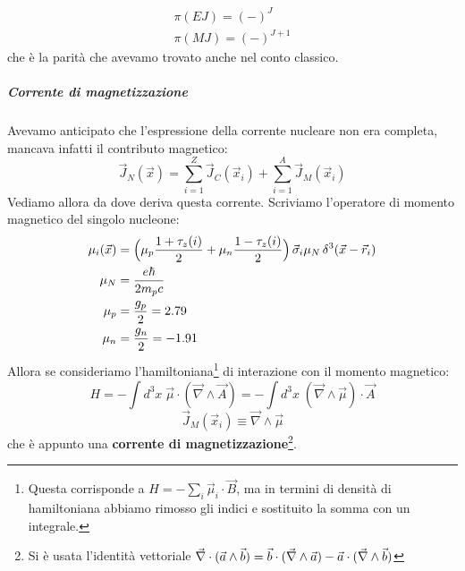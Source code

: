 \begin{displaymath}
\begin{array}{l}
    \pi(EJ) = (-)^J \\
    \pi(MJ) = (-)^{J+1}  
\end{array}
\end{displaymath}
che è la parità che avevamo trovato anche nel conto classico.

\subparagraph{Corrente di magnetizzazione} Avevamo anticipato che l'espressione della corrente nucleare non era completa, mancava infatti il contributo magnetico:
$$\vec{J}_N(\vec{x}) = \sum_{i=1}^Z \vec{J}_C(\vec{x}_i) + \sum_{i=1}^A \vec{J}_M (\vec{x}_i)$$
Vediamo allora da dove deriva questa corrente. Scriviamo l'operatore di momento magnetico del singolo nucleone:
\begin{displaymath}
\begin{aligned}
\mu_i (\vec{x}) &= \Bigl ( \mu_p \frac{1+\tau_z(i)}{2} + \mu_n \frac{1-\tau_z(i)}{2} \Bigr )\, \vec{\sigma}_i \mu_N \, \delta^3(\vec{x}-\vec{r}_i) \\
\mu_N &= \frac{e\hbar}{2m_pc} \\
\mu_p &= \frac{g_p}{2} = 2.79 \\
\mu_n &= \frac{g_n}{2} = -1.91
\end{aligned}
\end{displaymath}
Allora se consideriamo l'hamiltoniana\footnote{Questa corrisponde a $H = -\sum_i \vec{\mu}_i \cdot \vec{B}$, ma in termini di densità di hamiltoniana abbiamo rimosso gli indici e sostituito la somma con un integrale.} di interazione con il momento magnetico:
$$H = -\int d^3x \; \vec{\mu}\cdot(\vec{\nabla}\land \vec{A}) = -\int d^3x \; (\vec{\nabla}\land\vec{\mu})\cdot \vec{A} $$
$$\vec{J}_M (\vec{x}_i) \equiv \vec{\nabla}\land\vec{\mu}$$
che è appunto una \textbf{corrente di magnetizzazione}\footnote{Si è usata l'identità vettoriale $\vec{\nabla}\cdot(\vec{a}\land\vec{b}) = \vec{b}\cdot(\vec{\nabla}\land\vec{a})- \vec{a}\cdot(\vec{\nabla}\land\vec{b})$}.
